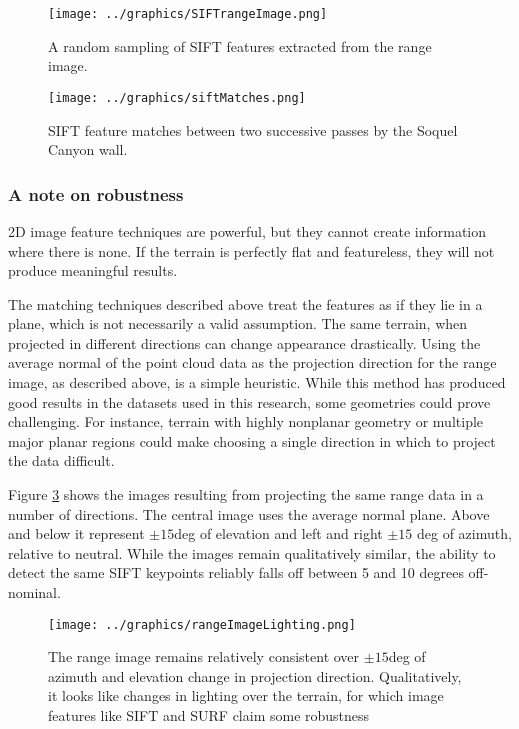 \begin{figure}[htb]
   \centering
   \texttt{[image: ../graphics/SIFTrangeImage.png]} %
   \caption{A random sampling of SIFT features extracted from the range image.}
   \label{fig:SIFTrangeImage}
\end{figure}

\begin{figure}[htb]
   \centering
   \texttt{[image: ../graphics/siftMatches.png]} %
   \caption{SIFT feature matches between two successive passes by the Soquel Canyon wall. }
   \label{fig:matches}
\end{figure}

\subsubsection{A note on robustness}

2D image feature techniques are powerful, but they cannot create information where there is none. If the terrain is perfectly flat and featureless, they will not produce meaningful results. 

The matching techniques described above treat the features as if they lie in a plane, which is not necessarily a valid assumption. The same terrain, when projected in different directions can change appearance drastically. Using the average normal of the point cloud data as the projection direction for the range image, as described above, is a simple heuristic. While this method has produced good results in the datasets used in this research, some geometries could prove challenging. For instance, terrain with highly nonplanar geometry or multiple major planar regions could make choosing a single direction in which to project the data difficult.  

Figure \ref{fig:lighting} shows the images resulting from projecting the same range data in a number of directions. The central image uses the average normal plane. Above and below it represent $\pm 15$deg of elevation and left and right $\pm 15$ deg of azimuth, relative to neutral. While the images remain qualitatively similar, the ability to detect the same SIFT keypoints reliably falls off between 5 and 10 degrees off-nominal.

\begin{figure}[htb]
   \centering
   \texttt{[image: ../graphics/rangeImageLighting.png]} %
   \caption{The range image remains relatively consistent over $\pm 15$deg of azimuth and elevation change in projection direction. Qualitatively, it looks like changes in lighting over the terrain, for which image features like SIFT and SURF claim some robustness \cite{Lowe2004} }
   \label{fig:lighting}
\end{figure}

